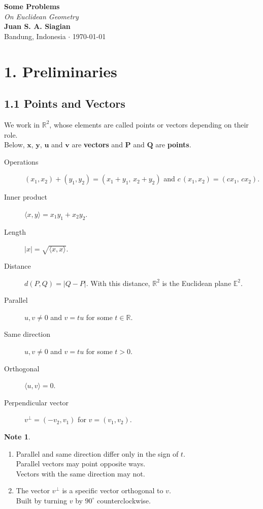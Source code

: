 \documentclass[11pt,a4paper]{article}
\theoremstyle{boxed}
\theoremstyle{definition}
\newtheorem*{note}{Note}
\newcommand{\R}{\mathbb{R}}
\newcommand{\E}{\mathbb{E}^2}
\newcommand{\ip}[2]{\langle #1, #2 \rangle}
\newcommand{\abs}[1]{\lvert #1 \rvert}
\begin{document}
\begin{center}
    \vspace*{2em}
    {\Huge \textbf{Some Problems}}\\[0.5em]
    {\Large \textit{On Euclidean Geometry}}\\[2em]

    {\large \textbf{Juan S. A. Siagian}}\\[0.5em]
    {\normalsize Bandung, Indonesia \hspace{0.5em} $\cdot$ \hspace{0.5em} \today}\\[3em]
\end{center}

\section*{1. Preliminaries}

\subsection*{1.1 Points and Vectors}
We work in $\R^2$, whose elements are called points or vectors depending on their role.\\
Below, $\boldsymbol{x}$, $\boldsymbol{y}$, $\boldsymbol{u}$ and $\boldsymbol{v}$ are \textbf{vectors} and $\boldsymbol{P}$ and $\boldsymbol{Q}$ are \textbf{points}.
\begin{description}
    \item[Operations] $(x_1,x_2)+(y_1,y_2)=(x_1+y_1,\,x_2+y_2)$ and $c\,(x_1,x_2)=(cx_1,\,cx_2)$.
    \item[Inner product] $\ip{x}{y}=x_1y_1+x_2y_2$.
    \item[Length] $\abs{x}=\sqrt{\ip{x}{x}}$.
    \item[Distance] $d(P,Q)=\abs{Q-P}$. With this distance, $\R^2$ is the Euclidean plane $\E$.
    \item[Parallel] $u,v\neq0$ and $v=tu$ for some $t\in\R$.
    \item[Same direction] $u,v\neq0$ and $v=tu$ for some $t>0$.
    \item[Orthogonal] $\ip{u}{v}=0$.
    \item[Perpendicular vector] $v^\perp=(-v_2,v_1)$ for $v=(v_1,v_2)$.
\end{description}

\begin{note}
\leavevmode
\begin{enumerate}[label=\arabic*.]
    \item Parallel and same direction differ only in the sign of $t$. \\
    Parallel vectors may point opposite ways. \\
    Vectors with the same direction may not.
    \item The vector $v^\perp$ is a specific vector orthogonal to $v$. \\
    Built by turning $v$ by $90^\circ$ counterclockwise.
\end{enumerate}
\end{note}
\end{document}
